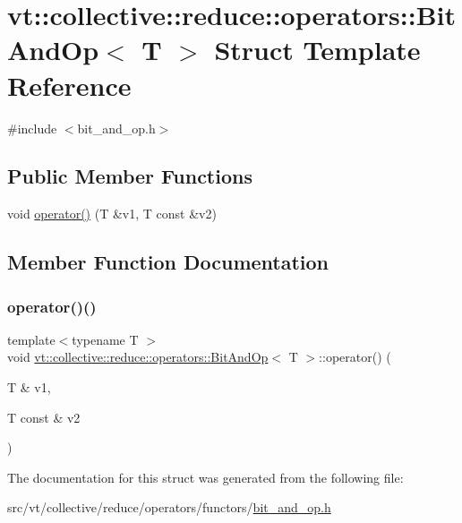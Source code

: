 \hypertarget{structvt_1_1collective_1_1reduce_1_1operators_1_1_bit_and_op}{}\section{vt\+:\+:collective\+:\+:reduce\+:\+:operators\+:\+:Bit\+And\+Op$<$ T $>$ Struct Template Reference}
\label{structvt_1_1collective_1_1reduce_1_1operators_1_1_bit_and_op}


{\ttfamily \#include $<$bit\+\_\+and\+\_\+op.\+h$>$}

\subsection*{Public Member Functions}
\begin{DoxyCompactItemize}
\item 
void \hyperlink{structvt_1_1collective_1_1reduce_1_1operators_1_1_bit_and_op_a2f6395a227c3c6fae75471371845f660}{operator()} (T \&v1, T const \&v2)
\end{DoxyCompactItemize}


\subsection{Member Function Documentation}
\mbox{\label{structvt_1_1collective_1_1reduce_1_1operators_1_1_bit_and_op_a2f6395a227c3c6fae75471371845f660}} 
\subsubsection{\texorpdfstring{operator()()}{operator()()}}
{\footnotesize\ttfamily template$<$typename T $>$ \\
void \hyperlink{structvt_1_1collective_1_1reduce_1_1operators_1_1_bit_and_op}{vt\+::collective\+::reduce\+::operators\+::\+Bit\+And\+Op}$<$ T $>$\+::operator() (\begin{DoxyParamCaption}\item[{T \&}]{v1,  }\item[{T const \&}]{v2 }\end{DoxyParamCaption})\hspace{0.3cm}{\ttfamily [inline]}}



The documentation for this struct was generated from the following file\+:\begin{DoxyCompactItemize}
\item 
src/vt/collective/reduce/operators/functors/\hyperlink{bit__and__op_8h}{bit\+\_\+and\+\_\+op.\+h}\end{DoxyCompactItemize}
